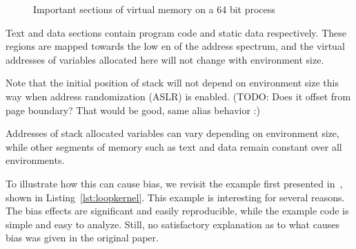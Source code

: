 \documentclass[a4paper,10pt,twocolumn,twoside]{article}
\begin{document}
\begin{figure}[float=h]
  \caption{Important sections of virtual memory on a 64 bit process}
  \label{fig:virtualmemory}
\end{figure}

Text and data sections contain program code and static data respectively.
These regions are mapped towards the low en of the address spectrum, and the virtual addresses of variables allocated here will not change with environment size. 

Note that the initial position of stack will not depend on environment size this way when address randomization (ASLR) is enabled. (TODO: Does it offset from page boundary? That would be good, same alias behavior :)

Addresses of stack allocated variables can vary depending on environment size, while other segments of memory such as text and data remain constant over all environments.

To illustrate how this can cause bias, we revisit the example first presented in~\cite{Mytkowicz:2009:WrongData}, shown in Listing~\ref{lst:loopkernel}. 
This example is interesting for several reasons. 
The bias effects are significant and easily reproducible, while the example code is simple and easy to analyze.
Still, no satisfactory explanation as to what causes bias was given in the original paper.
\end{document}
